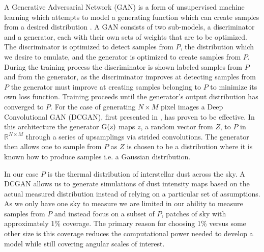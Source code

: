 \documentclass[twocolumn]{aastex62}
\begin{document}
A Generative Adversarial Network (GAN) is a form of unsupervised machine learning which attempts to model a generating function which can create samples from a desired distribution \citep{goodfellow14}. 
A GAN consists of two sub-models, a discriminator and a generator, each with their own sets of weights that are to be optimized.
The discriminator is optimized to detect samples from $P$, the distribution which we desire to emulate, and the generator is optimized to create samples from $P$.
During the training process the discriminator is shown labeled samples from $P$ and from the generator, as the discriminator improves at detecting samples from $P$ the generator must improve at creating samples belonging to $P$ to minimize its own loss function. Training proceeds until the generator's output distribution has converged to $P$.
For the case of generating $N\times M$ pixel images a Deep Convolutional GAN (DCGAN), first presented in \cite{radford15}, has proven to be effective. In this architecture the generator $\rm{G}(z)$ maps $z$, a random vector from $Z$, to $P$ in $\mathbb{R}^{N\times M}$ through a series of upsamplings via strided convolutions. 
The generator then allows one to sample from $P$ as $Z$ is chosen to be a distribution where it is known how to produce samples i.e. a Gaussian distribution.

In our case $P$ is the thermal distribution of interstellar dust across the sky.
A DCGAN allows us to generate simulations of dust intensity maps based on the actual measured distribution instead of relying on a particular set of assumptions. 
As we only have one sky to measure we are limited in our ability to measure samples from $P$ and instead focus on a subset of $P$, patches of sky with approximately 1\% coverage. 
The primary reason for choosing 1\% versus some other size is this coverage reduces the computational power needed to develop a model while still covering angular scales of interest.
\end{document}
